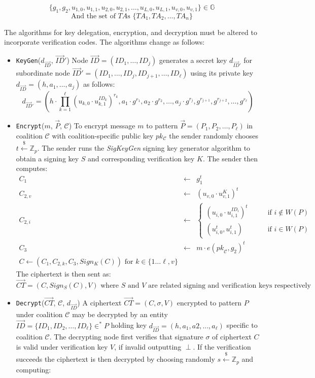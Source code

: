 \documentclass[10pt]{llncs}
\newcommand{\C}{\mathcal{C}}
\newcommand{\Zbb}{\mathbb{Z}}
\newcommand{\Gbb}{\mathbb{G}}
\newcommand{\ID}{\mathit{ID}}
\newcommand{\TA}{\mathit{TA}}
\newcommand{\pk}{\mathit{pk}}
\newcommand{\getsr}{\stackrel{{\scriptscriptstyle\$}}{\gets}}
\begin{document}
$$\{g_1, g_2, u_{1,0}, u_{1,1}, u_{2,0}, u_{2,1}, \ldots, u_{L,0}, u_{L,1}, u_{v,0}, u_{v,1}\} \in \Gbb$$
$$\textrm{And the set of $\TA$s } \{\TA_1, \TA_2, \ldots, \TA_n\}$$

The algorithms for key delegation, encryption, and decryption must be altered to incorporate verification codes. The algorithms change as follows:

\begin{itemize}
	\item \texttt{KeyGen}($d_{\vec{\ID}}$, $\vec{ID}'$) Node $\vec{ID} = (\ID_1, \ldots, \ID_j)$ generates a secret key $d_{\vec{\ID}'}$ for subordinate node $\vec{ID}' = (\ID_1, \ldots, \ID_j, \ID_{j+1}, \ldots, \ID_\ell)$ using its private key $d_{\vec{\ID}} = (h, a_1, \ldots, a_j)$ as follows:
		$$d_{\vec{\ID}'} = (h \cdot \prod_{k = 1}^\ell (u_{k, 0} \cdot u_{k,1}^{\ID_k})^{r_k}, a_1 \cdot g^{r_1}, a_2 \cdot g^{r_2}, \ldots, a_j \cdot g^{r_j}, g^{r_{j+1}}, g^{r_{j+2}}, \ldots, g^{r_\ell})$$
	\item \texttt{Encrypt}($m$, $\vec{P}$, $\C$) To encrypt message $m$ to pattern $\vec{P} = (P_1, P_2, \ldots, P_\ell)$ in coalition $\C$ with coalition-specific public key $pk_\C$ the sender randomly chooses $t \getsr \Zbb_p$. The sender runs the \emph{SigKeyGen} signing key generator algorithm to obtain a signing key $S$ and corresponding verification key $K$. The sender then computes:
	\begin{eqnarray*}
		C_{1} & \gets & g_{1}^{t} \\
		C_{2,v} & \gets & (u_{v, 0} \cdot u_{v,1}^K)^t\\
		C_{2,i} & \gets & \left\{
			\begin{array}{ll}
				(u_{i,0} \cdot u_{i,1}^{\ID_{i}})^{t} & \qquad \mbox{if } i \notin W(P) \\
				(u_{i,0}^{t},u_{i,1}^{t}) & \qquad \mbox{if } i \in W(P)
			\end{array}
		\right. \\
		C_{3} &\gets& m \cdot e(\pk_\C,g_{2})^{t}\\
		C \gets (C_1, C_{2,k}, C_3, Sign_{K}(C)) \textrm{ for } k\in\{1 \ldots \ell, v\}
	\end{eqnarray*}
	The ciphertext is then sent as:
	$$\vec{CT} = (C, Sign_S(C), V) \textrm{ where } S \textrm{ and } V \textrm{ are related signing and verification keys respectively}$$
	\item \texttt{Decrypt}($\vec{CT}$, $\C$, $d_{\vec{\ID}}$) A ciphertext $\vec{CT} = (C, \sigma, V)$ encrypted to pattern $P$ under coalition $\C$ may be decrypted by an entity $\vec{\ID} = \{\ID_1, \ID_2, \ldots, \ID_\ell\} \in^* P$ holding key $d_{\vec{\ID}} = (h, a_1, a2, \ldots, a_\ell)$ specific to coalition $\C$. The decrypting node first verifies that signature $\sigma$ of ciphertext $C$ is valid under verification key $V$, if invalid outputting $\perp$. If the verification succeeds the ciphertext is then decrypted by choosing randomly $s \getsr \Zbb_p$ and computing:

\end{itemize}
\end{document}
